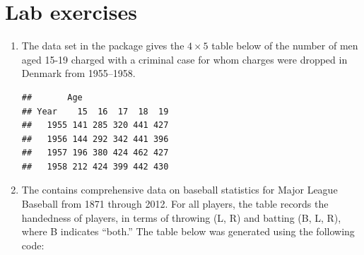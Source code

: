 \documentclass[11pt]{book}
\renewenvironment{knitrout}{\small\renewcommand{\baselinestretch}{.85}}{} %
\begin{document}
\section{Lab exercises}\label{sec:mosaic-lab}

\begin{enumerate}

\item The data set  in the package  gives the
$4 \times 5$ table below of the
number of men aged 15-19 charged with a criminal case for whom charges were dropped
in Denmark from 1955--1958.
\begin{knitrout}
\color{fgcolor}\begin{kframe}
\begin{alltt}
\hlstd{(}\hlstd{,} \hlstd{=}\hlstd{)}
\end{alltt}
\begin{verbatim}
##       Age
## Year    15  16  17  18  19
##   1955 141 285 320 441 427
##   1956 144 292 342 441 396
##   1957 196 380 424 462 427
##   1958 212 424 399 442 430
\end{verbatim}
\end{kframe}
\end{knitrout}

\item The  contains comprehensive data on baseball statistics for Major League Baseball from 1871 through 2012.  
For all players, the  table records the handedness of players, in terms of
throwing (L, R) and batting (B, L, R), where B indicates ``both.''
The table below was generated using the following code:
\begin{knitrout}
\color{fgcolor}\begin{kframe}
\begin{alltt}
\hlstd{(}\hlstd{,} \hlstd{=}\hlstd{)}
 \hlkwb{<-}  
\end{alltt}
\end{kframe}
\end{knitrout}



\end{enumerate}
\end{document}
